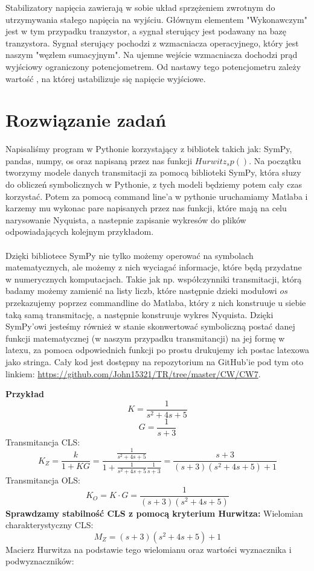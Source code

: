 \documentclass{article}
\begin{document}
Stabilizatory napięcia zawierają w sobie układ sprzężeniem zwrotnym do utrzymywania stałego napięcia na wyjściu. Głównym elementem "Wykonawczym"
jest w tym przypadku tranzystor, a sygnał sterujący jest podawany na bazę tranzystora. Sygnał sterujący pochodzi z wzmacniacza operacyjnego, który jest
naszym "węzłem sumacyjnym". Na ujemne wejście wzmacniacza dochodzi prąd wyjściowy ograniczony potencjometrem. Od nastawy tego potencjometru zależy wartość
, na której ustabilizuje się napięcie wyjściowe.

\section{Rozwiązanie zadań}

Napisaliśmy program w Pythonie korzystający z bibliotek takich jak: SymPy, pandas, numpy, 
os oraz napisaną przez nas funkcji $Hurwitz_sp()$. Na początku tworzymy modele danych 
transmitacji za pomocą biblioteki SymPy, która słuzy do obliczeń symbolicznych w 
Pythonie, z tych modeli będziemy potem cały czas korzystać. Potem za pomocą command 
line'a w pythonie uruchamiamy Matlaba i karzemy mu wykonac pare napisanych przez nas 
funkcji, które mają na celu narysowanie Nyquista, a nastepnie zapisanie wykresów do 
plików odpowiadających kolejnym przykładom.
\\ \\
Dzięki bibliotece SymPy nie tylko możemy operować na symbolach matematycznych, ale możemy z nich wyciagać informacje, które będą przydatne w numerycznych komputacjach. Takie jak np. współczynniki transmitacji, którą badamy możemy zamienić na listy liczb, które następnie dzieki modułowi $os$ przekazujemy poprzez commandline do Matlaba, który z nich konstruuje u siebie taką samą transmitację, a następnie konstruuje wykres Nyquista. Dzięki SymPy'owi jesteśmy również w stanie skonwertować symboliczną postać danej funkcji matematycznej (w naszym przypadku transmitancji) na jej formę w latexu, za pomoca odpowiednich funkcji po prostu drukujemy ich postac latexowa jako stringa.
Cały kod jest dostępny na repozytorium na GitHub'ie pod tym oto linkiem: \url{https://github.com/John15321/TR/tree/master/CW/CW7}.




\textbf{Przykład }
$$K=\frac{1}{s^{2} + 4 s + 5}$$
$$G=\frac{1}{s + 3}$$
Transmitancja CLS:
$$K_Z=\frac{k}{1+KG}=\frac{\frac{1}{s^{2} + 4 s + 5}}{1+\frac{1}{s^{2} + 4 s + 5}\frac{1}{s + 3}}=\frac{s + 3}{\left(s + 3\right) \left(s^{2} + 4 s + 5\right) + 1}$$
Transmitancja OLS:
$$K_O=K\cdot G=\frac{1}{\left(s + 3\right) \left(s^{2} + 4 s + 5\right)}$$
\textbf{Sprawdzamy stabilność CLS z pomocą kryterium Hurwitza:}\newline
Wielomian charakterystyczny CLS:
$$M_Z=\left(s + 3\right) \left(s^{2} + 4 s + 5\right) + 1$$
Macierz Hurwitza na podstawie tego wielomianu oraz wartości wyznacznika i podwyznaczników:
\end{document}
